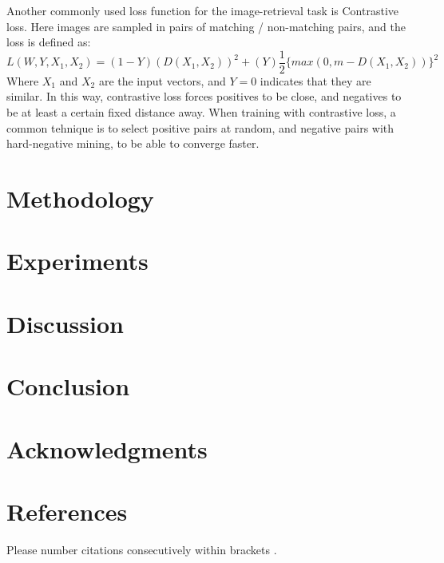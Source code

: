 \documentclass[conference]{IEEEtran}
\begin{document}
Another commonly used loss function for the image-retrieval task is Contrastive loss. Here images are sampled in pairs of matching / non-matching pairs, and the loss
is defined as:
\begin{equation}
    L(W, Y, X_{1}, X_{2}) = (1-Y)(D(X_{1}, X_{2}))^{2} + (Y)\frac{1}{2}\{max(0, m - D(X_{1}, X_{2}))\}^{2}
\end{equation}
Where $X_{1}$ and $X_{2}$ are the input vectors, and $Y = 0$ indicates that they are similar. In this way, contrastive loss forces positives to be close, and negatives to 
be at least a certain fixed distance away. When training with contrastive loss, a common tehnique is to select positive pairs at random, and negative pairs with hard-negative mining,
to be able to converge faster. 

\section{Methodology}


\section{Experiments}


\section{Discussion}


\section{Conclusion}


\section*{Acknowledgments}


\section*{References}

Please number citations consecutively within brackets \cite{IEEEhowto:IEEEtranpage}. 



\end{document}
